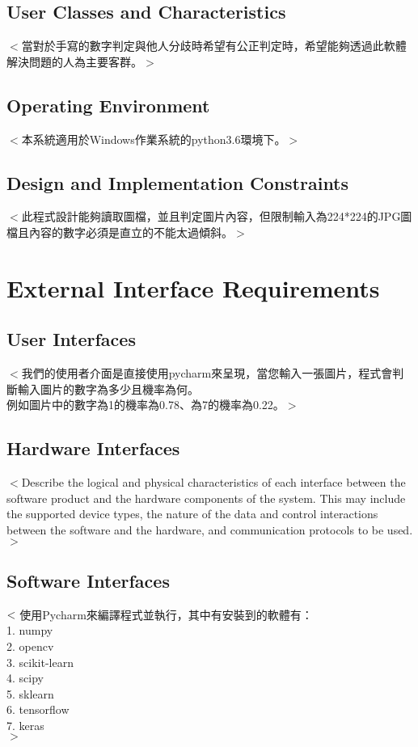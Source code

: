 \documentclass{scrreprt}
\begin{document}
\begin{CJK*}{UTF8}{bsmi}
\section{User Classes and Characteristics}
$<$當對於手寫的數字判定與他人分歧時希望有公正判定時，希望能夠透過此軟體解決問題的人為主要客群。$>$

\section{Operating Environment}
$<$本系統適用於Windows作業系統的python3.6環境下。$>$

\section{Design and Implementation Constraints}
$<$此程式設計能夠讀取圖檔，並且判定圖片內容，但限制輸入為224*224的JPG圖檔且內容的數字必須是直立的不能太過傾斜。$>$




\chapter{External Interface Requirements}

\section{User Interfaces}
$<$我們的使用者介面是直接使用pycharm來呈現，當您輸入一張圖片，程式會判斷輸入圖片的數字為多少且機率為何。\\例如圖片中的數字為1的機率為0.78、為7的機率為0.22。$>$

\section{Hardware Interfaces}
$<$Describe the logical and physical characteristics of each interface between 
the software product and the hardware components of the system. This may include 
the supported device types, the nature of the data and control interactions 
between the software and the hardware, and communication protocols to be 
used.$>$

\section{Software Interfaces}
$<\\$使用Pycharm來編譯程式並執行，其中有安裝到的軟體有：\\
1.	numpy\\
2.	opencv\\
3.	scikit-learn\\
4.	scipy\\
5.	sklearn\\
6.	tensorflow\\
7.	keras\\$>$



\end{CJK*}
\end{document}
